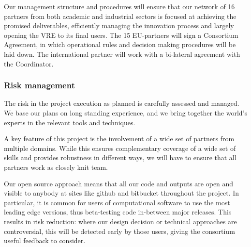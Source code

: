Our management structure and procedures will ensure that our network
of  16 partners from both academic and industrial sectors is focused at
achieving the promised deliverables, efficiently managing the
innovation process and largely opening the VRE to its final users. The
 15 EU-partners will sign a Consortium Agreement, in which operational
rules and decision making procedures will be laid down. The
international partner will work with a bi-lateral agreement with the
Coordinator.







\subsubsection{Risk management}

The risk in the project execution as planned is carefully assessed and
managed. We base our plans on long standing experience, and we bring
together the world's experts in the relevant tools and techniques.

A key feature of this project is the involvement of a wide set of
partners from multiple domains. While this ensures complementary
coverage of a wide set of skills and provides robustness in different
ways, we will have to ensure that all partners work as closely knit
team. 

Our open source approach means that all our code and outputs
are open and visible to anybody at sites like github and bitbucket
throughout the project. In particular, it is common for users of
computational software to use the most leading edge versions, thus
beta-testing code in-between major releases. This results in risk
reduction: where our design decision or technical approaches are
controversial, this will be detected early by those users, giving the
consortium useful feedback to consider.



